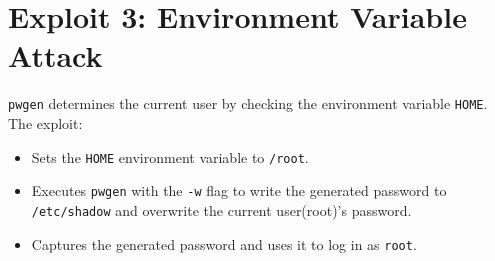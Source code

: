 \documentclass[12pt]{article}
\begin{document}
\section*{Exploit 3: Environment Variable Attack}
\texttt{pwgen} determines the current user by checking the environment variable \texttt{HOME}. The exploit:
\begin{itemize}
    \item Sets the \texttt{HOME} environment variable to \texttt{/root}.
    \item Executes \texttt{pwgen} with the \texttt{-w} flag to write the generated password to \texttt{/etc/shadow} and overwrite the current user(root)'s password.
    \item Captures the generated password and uses it to log in as \texttt{root}.
\end{itemize}
\end{document}
